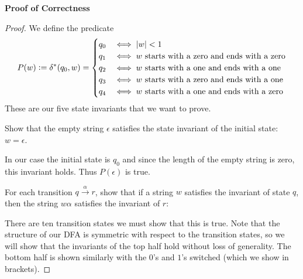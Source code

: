     \textbf{Proof of Correctness}
    \begin{proof}
        We define the predicate 
        \[
        P(w) \vcentcolon= \delta^*(q_0, w) = 
        \begin{cases} 
            q_0 & \text{$\iff \left | w \right | < 1$} \\
            q_1 & \text{$\iff w$ starts with a zero and ends with a zero} \\
            q_2 & \text{$\iff w$ starts with a one and ends with a one} \\
            q_3 & \text{$\iff w$ starts with a zero and ends with a one} \\
            q_4 & \text{$\iff w$ starts with a one and ends with a zero}
        \end{cases}
        \]
        These are our five state invariants that we want to prove.
        
        \newpage
        
        \base
        
        Show that the empty string $\epsilon$ satisfies the state invariant of 
        the initial state: $w = \epsilon$.
        
        In our case the initial state is $q_0$ and since the
        length of the empty string is zero, this invariant holds. Thus
        $P(\epsilon)$ is true.
        
        
        \istep 
        
        For each transition $q \xrightarrow{\alpha}r$, show that if a string $w$ satisfies the
        invariant of state $q$, then the string $w \alpha$ satisfies the invariant 
        of $r$: 
        
        There are ten transition states we must show that this is true.
        Note that the structure of our DFA is symmetric with respect to the
        transition states, so we will show that the invariants of the top
        half hold without loss of generality. The bottom half is shown 
        similarly with the $0$'s and $1$'s switched (which we show in brackets).



\end{proof}
